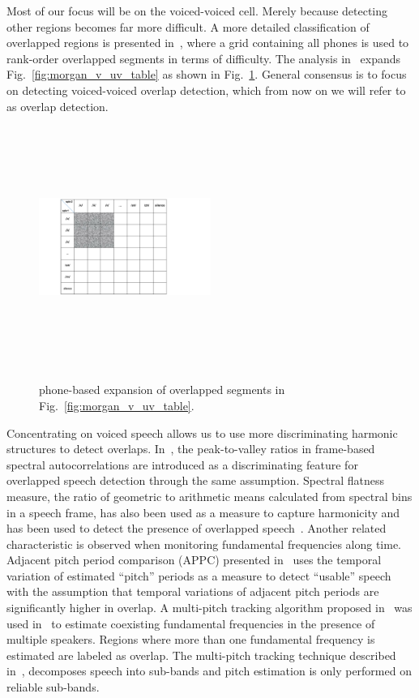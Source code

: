 Most of our focus will be on the voiced-voiced cell. 
Merely because detecting other regions becomes far more difficult. 
A more detailed classification of overlapped regions is presented in~\cite{fig:nav_icassp13}, where a grid containing all phones is used to rank-order overlapped segments in terms of difficulty. 
The analysis in~\cite{fig:nav_icasssp13} expands Fig.~\ref{fig:morgan_v_uv_table} as shown in Fig.~\ref{fig:nav_v_uv_table}. 
General consensus is to focus on detecting voiced-voiced overlap detection, which from now on we will refer to as overlap detection. 

\begin{figure}[h!]
	\centering
	\includegraphics[height = 3.1in, width=0.5\textwidth]{figures/nav_v_uv_table}	
	\label{fig:nav_v_uv_table}
	\caption{phone-based expansion of overlapped segments in Fig.~\ref{fig:morgan_v_uv_table}.}
\end{figure}

Concentrating on voiced speech allows us to use more discriminating harmonic structures to detect overlaps. 
In~\cite{sapvr_2000}, the peak-to-valley ratios in frame-based spectral autocorrelations are introduced as a discriminating feature for overlapped speech detection through the same assumption. 
Spectral flatness measure, the ratio of geometric to arithmetic means calculated from spectral bins in a speech frame, has also been used as a measure to capture harmonicity and has been used to detect the presence of overlapped speech~\cite{nav_icassp13}. 
Another related characteristic is observed when monitoring fundamental frequencies along time. 
Adjacent pitch period comparison (APPC) presented in~\cite{appc2001} uses the temporal variation of estimated ``pitch'' periods as a measure to detect ``usable'' speech with the assumption that temporal variations of adjacent pitch periods are significantly higher in overlap. 
A multi-pitch tracking algorithm proposed in~\cite{Dwang_03_trans} was used in~\cite{Dwang_03} to estimate coexisting fundamental frequencies in the presence of multiple speakers. 
Regions where more than one fundamental frequency is estimated are labeled as overlap. 
The multi-pitch tracking technique described in~\cite{Dwang_03_trans}, decomposes speech into sub-bands and pitch estimation is only performed on reliable sub-bands. 

